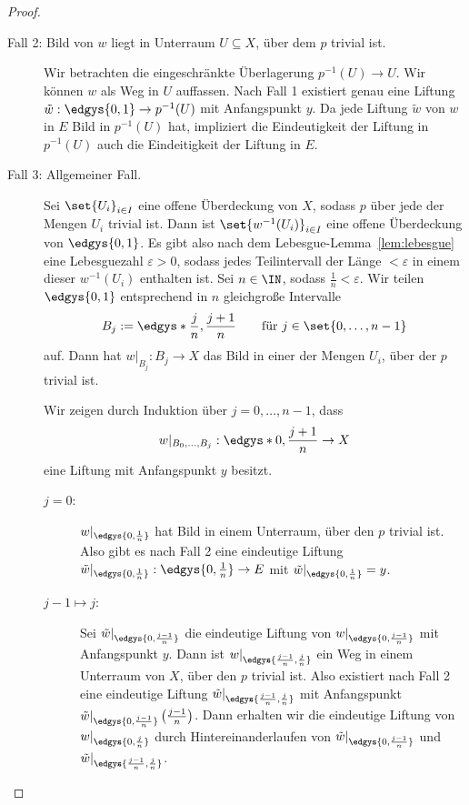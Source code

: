 \documentclass[language=ngerman]{TemplateLecture} %
\begin{document}
\begin{proof}
\begin{description}
        \item[Fall 2: Bild von $w$ liegt in Unterraum $U \subseteq X$, über dem $p$ trivial ist.] Wir betrachten die eingeschränkte Überlagerung $p^{-1}(U) \to U$. Wir können $w$ als Weg in $U$ auffassen. Nach Fall 1 existiert genau eine Liftung $\tilde{w}: \edgys{0,1} \to p^{-1}(U)$ mit Anfangspunkt $y$. Da jede Liftung $\tilde{w}$ von $w$ in $E$ Bild in $p^{-1}(U)$ hat, impliziert die Eindeutigkeit der Liftung in $p^{-1}(U)$ auch die Eindeitigkeit der Liftung in $E$.
        \item[Fall 3: Allgemeiner Fall.] Sei $\set{U_i}_{i \in I}$ eine offene Überdeckung von $X$, sodass $p$ über jede der Mengen $U_i$ trivial ist. Dann ist $\set{w^{-1}(U_i)}_{i \in I}$ eine offene Überdeckung von $\edgys{0,1}$. 
        Es gibt also nach dem Lebesgue-Lemma~\ref{lem:lebesgue} eine Lebesguezahl $\varepsilon > 0$, sodass jedes Teilintervall der Länge $<\varepsilon$ in einem dieser $w^{-1}(U_i)$ enthalten ist. Sei $n \in \IN$, sodass $\frac{1}{n} < \varepsilon$. Wir teilen $\edgys{0,1}$ entsprechend in $n$ gleichgroße Intervalle
        \begin{equation*}
            B_j := \edgys*{\frac{j}{n}, \frac{j+1}{n}} \quad \quad \text{für $j \in \set{0,\ldots,n-1}$}
        \end{equation*}
        auf. Dann hat $w|_{B_j} : B_j \to X$ das Bild in einer der Mengen $U_i$, über der $p$ trivial ist.

        Wir zeigen durch Induktion über $j = 0, \ldots, n-1$, dass
        \begin{equation*}
            w|_{B_0, \ldots, B_j} : \edgys*{0, \frac{j+1}{n}} \to X
        \end{equation*}
        eine Liftung mit Anfangspunkt $y$ besitzt.

        \begin{description}
            \item[$j = 0$:] $w|_{\edgys{0, \frac{1}{n}}}$ hat Bild in einem Unterraum, über den $p$ trivial ist. Also gibt es nach Fall 2 eine eindeutige Liftung $\tilde{w}|_{\edgys{0, \frac{1}{n}}} : \edgys{0, \frac{1}{n}} \to E$ mit $\tilde{w}|_{\edgys{0, \frac{1}{n}}} = y$.
            \item[$j-1 \mapsto j$:] Sei $\tilde{w}|_{\edgys{0, \frac{j - 1}{n}}}$ die eindeutige Liftung von $w|_{\edgys{0, \frac{j - 1}{n}}}$ mit Anfangspunkt $y$. Dann ist $w|_{\edgys{\frac{j-1}{n}, \frac{j}{n}}}$ ein Weg in einem Unterraum von $X$, über den $p$ trivial ist. Also existiert nach Fall 2 eine eindeutige Liftung $\tilde{w}|_{\edgys{\frac{j-1}{n}, \frac{j}{n}}}$ mit Anfangspunkt $\tilde{w}|_{\edgys{0, \frac{j - 1}{n}}}\left(\frac{j-1}{n}\right)$. 
            Dann erhalten wir die eindeutige Liftung von $w|_{\edgys{0, \frac{j}{n}}}$ durch Hintereinanderlaufen von $\tilde{w}|_{\edgys{0, \frac{j-1}{n}}}$ und $\tilde{w}|_{\edgys{\frac{j-1}{n}, \frac{j}{n}}}$.
        \end{description}
    \end{description}
\end{proof}
\end{document}
